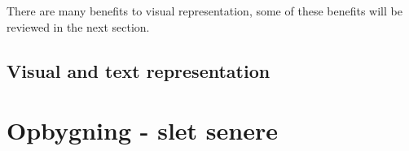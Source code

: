 There are many benefits to visual representation, some of these benefits will be reviewed in the next section.
\subsection{Visual and text representation}\label{ch:visual_and_text_representation}



\section{Opbygning - slet senere}\label{ch:opbygning}




